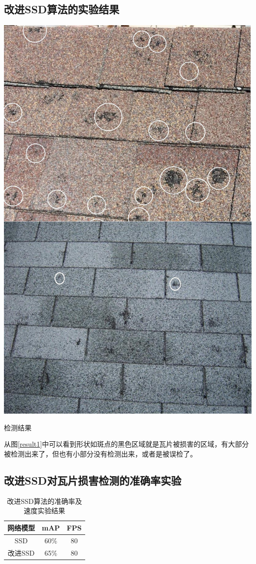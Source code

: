 \subsection{改进SSD算法的实验结果}
\begin{uscfigure}
	\includegraphics[width=\textwidth]{./Pictures/result.jpg}	
	\caption{检测结果}
	\label{result1}
\end{uscfigure}

从图\ref{result1}中可以看到形状如斑点的黑色区域就是瓦片被损害的区域，有大部分被检测出来了，但也有小部分没有检测出来，或者是被误检了。
\subsection{改进SSD对瓦片损害检测的准确率实验}
\begin{table}[htbp]
	\centering
	\caption{改进SSD算法的准确率及速度实验结果}
	\label{}
	\begin{tabular}{ccc}
		\toprule
		网络模型 & mAP & FPS\\
		\midrule
		SSD 	& 60\% & 80\\
		改进SSD  &  65\% & 80\\
		\bottomrule
	\end{tabular}
\end{table}

